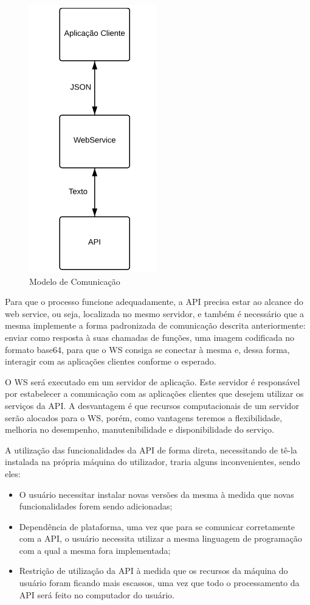 \documentclass[12pt]{article}
\begin{document}
\begin{figure}[ht]
	\centering
	\includegraphics[width=.3\textwidth]{modelo-comunicacao2.png}
	\caption{Modelo de Comunicação}
	\label{fig:Figura2}
\end{figure}

Para que o processo funcione adequadamente, a API precisa estar ao alcance do web service, ou seja, localizada no mesmo servidor, e também é necessário que a mesma implemente a forma padronizada de comunicação descrita anteriormente: enviar como resposta à suas chamadas de funções, uma imagem codificada no formato base64, para que o
WS consiga se conectar à mesma e, dessa forma, interagir com as aplicações clientes conforme o esperado.

O WS será executado em um servidor de aplicação. Este servidor
é responsável por estabelecer a comunicação com as aplicações clientes que desejem utilizar os serviços da API. 
A desvantagem é que recursos computacionais de um servidor serão alocados para o WS, porém, como vantagens teremos a flexibilidade, melhoria no desempenho, manutenibilidade e disponibilidade do serviço.

A utilização das funcionalidades da API de forma direta, necessitando de tê-la instalada na própria máquina do utilizador, traria alguns inconvenientes, sendo eles:
\begin{itemize}
	\item O usuário necessitar instalar novas versões da mesma à medida que novas funcionalidades forem sendo adicionadas;
	\item Dependência de plataforma, uma vez que para se comunicar corretamente com a API, o usuário necessita utilizar a mesma linguagem de programação com a qual a mesma fora implementada;
	\item Restrição de utilização da API à medida que os recursos da máquina do usuário foram ficando mais escassos, uma vez que todo o processamento da API será feito no computador do usuário.
\end{itemize}
\end{document}
